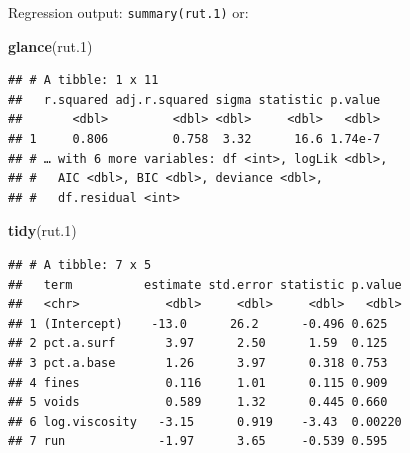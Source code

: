 \documentclass[
  ignorenonframetext,
]{beamer}
\newenvironment{Shaded}{\begin{snugshade}}{\end{snugshade}}
\newcommand{\FloatTok}[1]{\textcolor[rgb]{0.00,0.00,0.81}{#1}}
\newcommand{\KeywordTok}[1]{\textcolor[rgb]{0.13,0.29,0.53}{\textbf{#1}}}
\newcommand{\NormalTok}[1]{#1}
\begin{document}
\begin{frame}[fragile]{Regression output: \texttt{summary(rut.1)} or:}
\protect\hypertarget{regression-output-summaryrut.1-or}{}

\footnotesize

\begin{Shaded}
\begin{Highlighting}[]
\KeywordTok{glance}\NormalTok{(rut}\FloatTok{.1}\NormalTok{)}
\end{Highlighting}
\end{Shaded}

\begin{verbatim}
## # A tibble: 1 x 11
##   r.squared adj.r.squared sigma statistic p.value
##       <dbl>         <dbl> <dbl>     <dbl>   <dbl>
## 1     0.806         0.758  3.32      16.6 1.74e-7
## # … with 6 more variables: df <int>, logLik <dbl>,
## #   AIC <dbl>, BIC <dbl>, deviance <dbl>,
## #   df.residual <int>
\end{verbatim}

\begin{Shaded}
\begin{Highlighting}[]
\KeywordTok{tidy}\NormalTok{(rut}\FloatTok{.1}\NormalTok{)}
\end{Highlighting}
\end{Shaded}

\begin{verbatim}
## # A tibble: 7 x 5
##   term          estimate std.error statistic p.value
##   <chr>            <dbl>     <dbl>     <dbl>   <dbl>
## 1 (Intercept)    -13.0      26.2      -0.496 0.625  
## 2 pct.a.surf       3.97      2.50      1.59  0.125  
## 3 pct.a.base       1.26      3.97      0.318 0.753  
## 4 fines            0.116     1.01      0.115 0.909  
## 5 voids            0.589     1.32      0.445 0.660  
## 6 log.viscosity   -3.15      0.919    -3.43  0.00220
## 7 run             -1.97      3.65     -0.539 0.595
\end{verbatim}

\normalsize

\end{frame}
\end{document}
